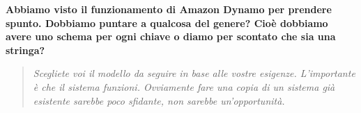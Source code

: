 \documentclass{scalatekids-article}
\begin{document}
\textbf{Abbiamo visto il funzionamento di Amazon Dynamo per prendere spunto. Dobbiamo puntare a qualcosa del genere? Cioè dobbiamo avere uno schema per ogni chiave o diamo per scontato che sia una stringa?}
\begin{quote}
  \textit{Scegliete voi il modello da seguire in base alle vostre esigenze. L'importante è che il sistema funzioni. Ovviamente fare una copia di un sistema già esistente sarebbe poco sfidante, non sarebbe un'opportunità.}
\end{quote}
\end{document}
